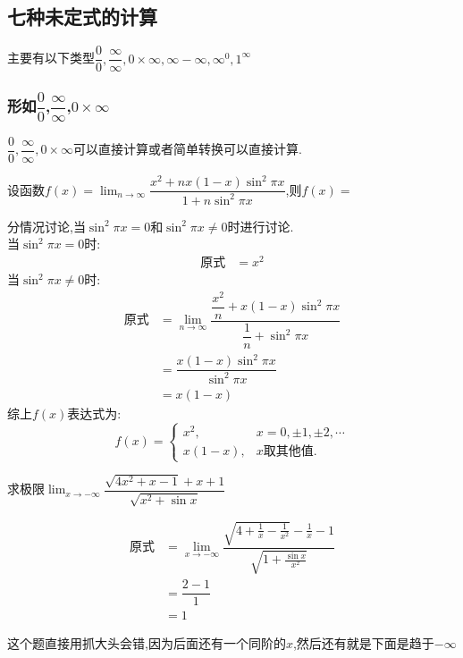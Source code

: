 \documentclass[8pt a4paper, oneside, UTF8]{ctexbook}
\begin{document}
\begin{sloppypar}
    \subsection{七种未定式的计算}
    主要有以下类型$\dfrac{0}{0},\dfrac{\infty}{\infty},0 \times \infty,\infty -\infty,\infty ^0,1^\infty$
    \subsubsection{形如$\dfrac{0}{0}$,$\dfrac{\infty}{\infty}$,$0 \times \infty$}
    $\dfrac{0}{0},\dfrac{\infty}{\infty},0 \times \infty$可以直接计算或者简单转换可以直接计算.
    \begin{problem}
    设函数$f(x)=\operatorname*{lim}_{n\to\infty} \dfrac{x^2+nx(1-x)\sin^2\pi x}{1+n\sin^{2}\pi x}$,则$f(x)=$
    \end{problem}
    \begin{solution}
        分情况讨论,当$\sin^2 \pi x=0$和$\sin^2 \pi x \neq 0$时进行讨论.\\
        当$\sin^2 \pi x=0$时:
        \begin{align*}
            \text{原式} & = x^2
        \end{align*}
        当$\sin^2 \pi x \neq 0$时:
        \begin{align*}
            \text{原式} & =\lim_{n\to\infty}\dfrac{\dfrac{x^{2}}{n}+x(1-x)\sin^{2}\pi x}{\dfrac{1}{n}+\sin^{2}\pi x} \\
                      & =\dfrac{x(1-x)\sin^{2}\pi x}{\sin^{2}\pi x}                                                \\
                      & =x(1-x)
        \end{align*}
        综上$f(x)$表达式为: $$f(x)=\begin{cases}x^2,&x=0, \pm1, \pm2, \cdots\\x(1-x),&x\text{取其他值}.\end{cases}$$
    \end{solution}
    \begin{problem}
    求极限$\lim_{x\to-\infty}\dfrac{\sqrt{4x^2+x-1}+x+1}{\sqrt{x^2+\sin x}}$
    \end{problem}
    \begin{solution}
        \begin{align*}
            \text{原式} & = \lim_{x\to-\infty} \dfrac{\sqrt{4+\frac{1}{x}-\frac{1}{x^2}}-\frac{1}{x}-1}{\sqrt{1+\frac{\sin x}{x^2}}} \\
                      & =  \dfrac{2-1}{1}                                                                                          \\
                      & = 1
        \end{align*}
    \end{solution}
    \begin{note}
        这个题直接用抓大头会错,因为后面还有一个同阶的$x$,然后还有就是下面是趋于$- \infty$
    \end{note}

\end{sloppypar}
\end{document}
